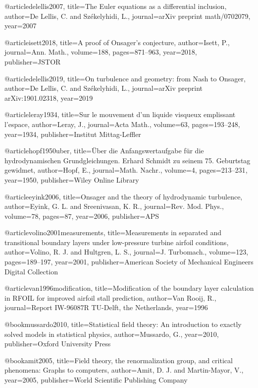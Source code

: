 @article{delellis2007,
  title={{The Euler equations as a differential inclusion}},
  author={De Lellis, C. and Sz{\'e}kelyhidi, L.},
  journal={arXiv preprint math/0702079},
  year={2007}
}

@article{isett2018,
  title={{A proof of Onsager's conjecture}},
  author={Isett, P.},
  journal={Ann. Math.},
  volume={188},
  pages={871--963},
  year={2018},
  publisher={JSTOR}
}

@article{delellis2019,
  title={{On turbulence and geometry: from Nash to Onsager}},
  author={De Lellis, C. and Sz{\'e}kelyhidi, L.},
  journal={arXiv preprint arXiv:1901.02318},
  year={2019}
}

@article{leray1934,
  title={{Sur le mouvement d'un liquide visqueux emplissant l'espace}},
  author={Leray, J.},
  journal={Acta Math.},
  volume={63},
  pages={193--248},
  year={1934},
  publisher={Institut Mittag-Leffler}
}

@article{hopf1950uber,
  title={{{\"U}ber die Anfangswertaufgabe f{\"u}r die hydrodynamischen Grundgleichungen. Erhard Schmidt zu seinem 75. Geburtstag gewidmet}},
  author={Hopf, E.},
  journal={Math. Nachr.},
  volume={4},
  pages={213--231},
  year={1950},
  publisher={Wiley Online Library}
}

@article{eyink2006,
  title={{Onsager and the theory of hydrodynamic turbulence}},
  author={Eyink, G. L. and Sreenivasan, K. R.},
  journal={Rev. Mod. Phys.},
  volume={78},
  pages={87},
  year={2006},
  publisher={APS}
}


@article{volino2001measurements,
  title={{Measurements in separated and transitional boundary layers under low-pressure turbine airfoil conditions}},
  author={Volino, R. J. and Hultgren, L. S.},
  journal={J. Turbomach.},
  volume={123},
  pages={189--197},
  year={2001},
  publisher={American Society of Mechanical Engineers Digital Collection}
}

@article{van1996modification,
  title={{{Modification of the boundary layer calculation in RFOIL for improved airfoil stall prediction}}},
  author={Van Rooij, R.},
  journal={Report IW-96087R TU-Delft, the Netherlands},
  year={1996}
}

  @book{mussardo2010,
    title={Statistical field theory: An introduction to exactly solved models in statistical physics},
    author={Mussardo, G.},
    year={2010},
    publisher={Oxford University Press}
  }

  @book{amit2005,
    title={{Field theory, the renormalization group, and critical phenomena: Graphs to computers}},
    author={Amit, D. J. and Martin-Mayor, V.},
    year={2005},
    publisher={World Scientific Publishing Company}
  }

